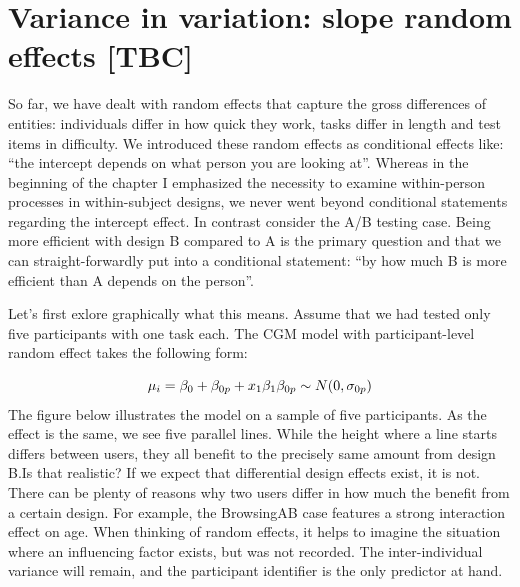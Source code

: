 \documentclass[]{svmono}
\begin{document}
\section{Variance in variation: slope random effects
{[}TBC{]}}\label{slope_RE}

So far, we have dealt with random effects that capture the gross
differences of entities: individuals differ in how quick they work,
tasks differ in length and test items in difficulty. We introduced these
random effects as conditional effects like: ``the intercept depends on
what person you are looking at''. Whereas in the beginning of the
chapter I emphasized the necessity to examine within-person processes in
within-subject designs, we never went beyond conditional statements
regarding the intercept effect. In contrast consider the A/B testing
case. Being more efficient with design B compared to A is the primary
question and that we can straight-forwardly put into a conditional
statement: ``by how much B is more efficient than A depends on the
person''.

Let's first exlore graphically what this means. Assume that we had
tested only five participants with one task each. The CGM model with
participant-level random effect takes the following form:

\[
\mu_i = \beta_0 + \beta_{0p} + x_1\beta_1\\
\beta_{0p} \sim N(0,\sigma_{0p})
\] The figure below illustrates the model on a sample of five
participants. As the effect is the same, we see five parallel lines.
While the height where a line starts differs between users, they all
benefit to the precisely same amount from design B.Is that realistic? If
we expect that differential design effects exist, it is not. There can
be plenty of reasons why two users differ in how much the benefit from a
certain design. For example, the BrowsingAB case features a strong
interaction effect on age. When thinking of random effects, it helps to
imagine the situation where an influencing factor exists, but was not
recorded. The inter-individual variance will remain, and the participant
identifier is the only predictor at hand.
\end{document}
